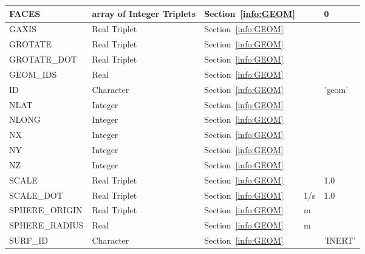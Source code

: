 \documentclass[12pt]{article}
\begin{document}
\begin{longtable}{@{\extracolsep{\fill}}|l|l|l|l|l|}
{\ct FACES}        & array of Integer Triplets     & Section~\ref{info:GEOM}     &           &    0                     \\ \hline
{\ct GAXIS}        & Real Triplet           & Section~\ref{info:GEOM}            &           &                          \\ \hline
{\ct GROTATE}      & Real Triplet           & Section~\ref{info:GEOM}            &           &                          \\ \hline
{\ct GROTATE\_DOT}  & Real Triplet           & Section~\ref{info:GEOM}            &           &                          \\ \hline
{\ct GEOM\_IDS}    & Real                   & Section~\ref{info:GEOM}            &           &                          \\ \hline
{\ct ID}           & Character              & Section~\ref{info:GEOM}            &           &   {\ct 'geom'}           \\ \hline
{\ct NLAT}         & Integer                & Section~\ref{info:GEOM}            &           &                          \\ \hline
{\ct NLONG}        & Integer                & Section~\ref{info:GEOM}            &           &                          \\ \hline
{\ct NX}           & Integer                & Section~\ref{info:GEOM}            &           &                          \\ \hline
{\ct NY}           & Integer                & Section~\ref{info:GEOM}            &           &                          \\ \hline
{\ct NZ}           & Integer                & Section~\ref{info:GEOM}            &           &                          \\ \hline
{\ct SCALE}        & Real Triplet           & Section~\ref{info:GEOM}            &           &   1.0                    \\ \hline
{\ct SCALE\_DOT}   & Real Triplet           & Section~\ref{info:GEOM}            &  1/s      &   1.0                    \\ \hline
{\ct SPHERE\_ORIGIN}& Real Triplet           & Section~\ref{info:GEOM}            &   m       &                          \\ \hline
{\ct SPHERE\_RADIUS}& Real                   & Section~\ref{info:GEOM}            &   m       &                          \\ \hline
{\ct SURF\_ID}     & Character              & Section~\ref{info:GEOM}            &           &  {\ct 'INERT'}           \\ \hline

\end{longtable}
\end{document}

